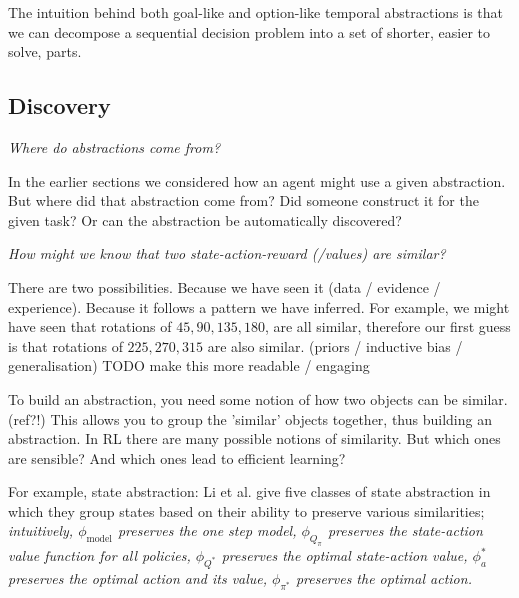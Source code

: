 The intuition behind both goal-like and option-like temporal abstractions is that
we can decompose a sequential decision problem into a set of shorter, easier to solve, parts.

\subsection{Discovery}

\begin{displayquote}
  \textit{Where do abstractions come from?}
\end{displayquote}

In the earlier sections we considered how an agent might use a given abstraction.
But where did that abstraction come from? Did someone construct it for the given task?
Or can the abstraction be automatically discovered?





\begin{displayquote}
	\textit{How might we know that two state-action-reward (/values) are similar?}
\end{displayquote}

There are two possibilities. Because we have seen it (data / evidence / experience).
Because it follows a pattern we have inferred. For example, we might have seen
that rotations of $45, 90, 135, 180$, are all similar, therefore our first guess
is that rotations of $225, 270, 315$ are also similar. (priors / inductive bias / generalisation)
{\color{red} TODO make this more readable / engaging}

To build an abstraction, you need some notion of how two objects can be similar. (ref?!)
This allows you to group the 'similar' objects together, thus building an abstraction.
In RL there are many possible notions of similarity. But which ones are sensible?
And which ones lead to efficient learning?

\vspace{5mm}

For example, state abstraction: Li et al. \cite{Littman2006} give five classes of
state abstraction in which they group states based on their ability to preserve various similarities;
\textit{intuitively,
$\phi_{\text{model}}$ preserves the one step model,
$\phi_{Q_{\pi}}$ preserves the state-action value function for all policies,
$\phi_{Q^{* }}$ preserves the optimal state-action value,
$\phi_a^{* }$ preserves the optimal action and its value,
$\phi_{\pi^{* }}$ preserves the optimal action.}

